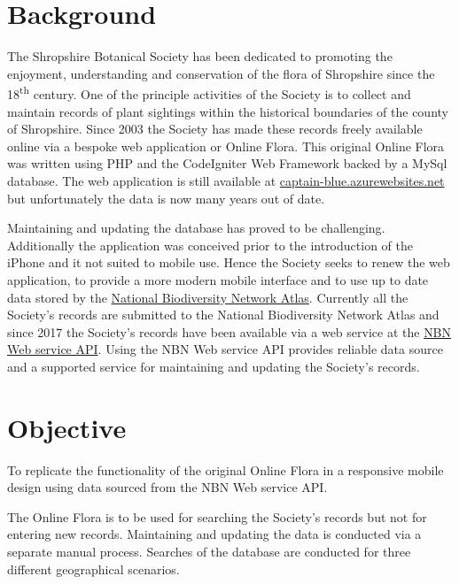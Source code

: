 \documentclass[a4paper,12pt,landscape]{article}
\begin{document}
\begin{multicols*}{2}
  \setcounter{tocdepth}{3}
  \tableofcontents
  \vfill\strut
  \columnbreak

  \section{Background}
  The Shropshire Botanical Society
  has been dedicated to promoting the enjoyment,
  understanding and conservation of the flora of Shropshire
  since the 18\textsuperscript{th} century.
  One of the principle activities of the Society is to collect and maintain records 
  of plant sightings within the historical boundaries of the county of Shropshire.
  Since 2003 the Society has made these records freely available online via a bespoke web application
  or Online Flora.
  This original Online Flora was written using
  PHP and the CodeIgniter Web Framework
  backed by a MySql database.
  The web application is still available at 
  \href{https://captain-blue.azurewebsites.net/}{captain-blue.azurewebsites.net}
  but unfortunately the data is now many years out of date.

  Maintaining and updating the database has proved to be challenging.
  Additionally the application was conceived prior to the introduction of the iPhone
  and it not suited to mobile use.
  Hence the Society seeks to renew the web application,
  to provide a more modern mobile interface
  and to use up to date data stored
  by the \href{https://nbnatlas.org/}{National Biodiversity Network Atlas}.
  Currently all the Society's records are submitted to the 
  National Biodiversity Network Atlas
  and since 2017 the Society's records have been available via a web service at
  the \href{https://api.nbnatlas.org/}{NBN Web service API}.
  Using the NBN Web service API provides reliable data source
  and
  a supported service for maintaining and updating the Society's records.

  \clearpage

  \section{Objective}
  To replicate the functionality of the original Online Flora
  in a responsive mobile design
  using data sourced from the NBN Web service API.

  The Online Flora is to be used for searching the Society's records
  but not for entering new records.
  Maintaining and updating the data is conducted via a separate manual process.
  Searches of the database are conducted for three different geographical scenarios.


\end{multicols*}
\end{document}
